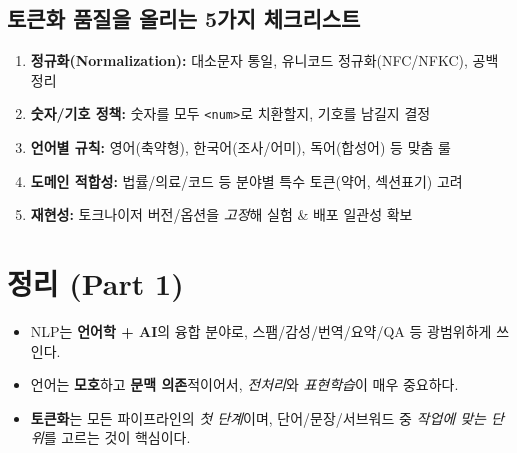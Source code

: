 \documentclass[12pt]{article}
\begin{document}
\subsection{토큰화 품질을 올리는 5가지 체크리스트}
\begin{enumerate}[left=0pt]
  \item \textbf{정규화(Normalization):} 대소문자 통일, 유니코드 정규화(NFC/NFKC), 공백 정리
  \item \textbf{숫자/기호 정책:} 숫자를 모두 \texttt{<num>}로 치환할지, 기호를 남길지 결정
  \item \textbf{언어별 규칙:} 영어(축약형), 한국어(조사/어미), 독어(합성어) 등 맞춤 룰
  \item \textbf{도메인 적합성:} 법률/의료/코드 등 분야별 특수 토큰(약어, 섹션표기) 고려
  \item \textbf{재현성:} 토크나이저 버전/옵션을 \emph{고정}해 실험 \& 배포 일관성 확보
\end{enumerate}

\section*{정리 (Part 1)}
\begin{itemize}
  \item NLP는 \textbf{언어학 + AI}의 융합 분야로, 스팸/감성/번역/요약/QA 등 광범위하게 쓰인다.
  \item 언어는 \textbf{모호}하고 \textbf{문맥 의존}적이어서, \emph{전처리}와 \emph{표현학습}이 매우 중요하다.
  \item \textbf{토큰화}는 모든 파이프라인의 \emph{첫 단계}이며, 단어/문장/서브워드 중 \emph{작업에 맞는 단위}를 고르는 것이 핵심이다.
\end{itemize}
\end{document}
